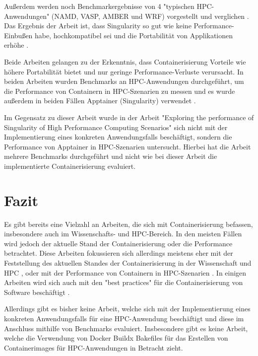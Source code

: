 Außerdem werden noch Benchmarkergebnisse von 4 "typischen HPC-Anwendungen" (NAMD, VASP, AMBER und WRF) vorgestellt und verglichen \cite[Vgl. S. 2587]{huExploringPerformanceSingularity2019}. Das Ergebnis der Arbeit ist, dass Singularity so gut wie keine Performance-Einbußen habe, hochkompatibel sei und die Portabilität von Applikationen erhöhe \cite[Vgl. S. 2592]{huExploringPerformanceSingularity2019}.  

Beide Arbeiten gelangen zu der Erkenntnis, dass Containerisierung Vorteile wie höhere Portabilität bietet und nur geringe Performance-Verluste verursacht. In beiden Arbeiten wurden Benchmarks an HPC-Anwendungen durchgeführt, um die Performance von Containern in HPC-Szenarien zu messen \cite[Vgl. S. 2587]{huExploringPerformanceSingularity2019} und es wurde außerdem in beiden Fällen Apptainer (Singularity) verwendet \cite[Vgl. S. 2587]{huExploringPerformanceSingularity2019}.

Im Gegensatz zu dieser Arbeit wurde in der Arbeit "Exploring the performance of Singularity of High Performance Computing Scenarios" \cite{huExploringPerformanceSingularity2019} sich nicht mit der Implementierung eines konkreten Anwendungsfalls beschäftigt, sondern die Performance von Apptainer in HPC-Szenarien untersucht. Hierbei hat die Arbeit mehrere Benchmarks durchgeführt \cite[Vgl. S. 2587]{huExploringPerformanceSingularity2019} und nicht wie bei dieser Arbeit die implementierte Containerisierung evaluiert.  


\section{Fazit}

Es gibt bereits eine Vielzahl an Arbeiten, die sich mit Containerisierung befassen, insbesondere auch im Wissenschafts- und HPC-Bereich. In den meisten Fällen wird jedoch der aktuelle Stand der Containerisierung oder die Performance betrachtet. Diese Arbeiten fokussieren sich allerdings meistens eher mit der Feststellung des aktuellen Standes der Containerisierung in der Wissenschaft und HPC \cite{moreauContainersComputationalReproducibility2023}, oder mit der Performance von Containern in HPC-Szenarien \cite{huExploringPerformanceSingularity2019}. In einigen Arbeiten wird sich auch mit den "best practices" für die Containerisierung von Software beschäftigt \cite{fachrudinImplementationAnalysisContainer2025}.

Allerdings gibt es bisher keine Arbeit, welche sich mit der Implementierung eines konkreten Anwendungsfalls für eine HPC-Anwendung beschäftigt und diese im Anschluss mithilfe von Benchmarks evaluiert. Insbesondere gibt es keine Arbeit, welche die Verwendung von Docker Buildx Bakefiles für das Erstellen von Containerimages für HPC-Anwendungen in Betracht zieht.



